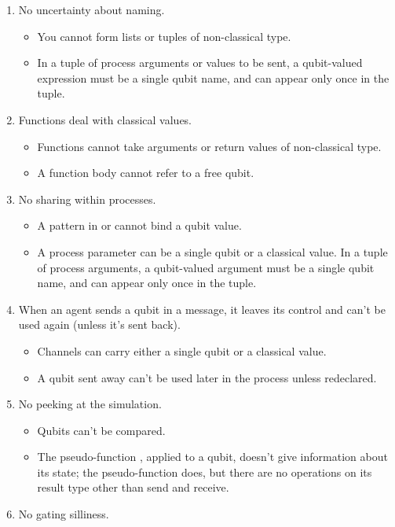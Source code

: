 \begin{enumerate}
\item No uncertainty about naming.
\begin{itemize}
\item You cannot form lists or tuples of non-classical type. 
\item In a tuple of process arguments or values to be sent, a qubit-valued expression must be a single qubit name, and can appear only once in the tuple.
\end{itemize}
\item Functions deal with classical values.
\begin{itemize}
\item Functions cannot take arguments or return values of non-classical type.
\item A function body cannot refer to a free qubit.
\end{itemize}
\item No sharing within processes.
\begin{itemize}
\item A pattern in  or  cannot bind a qubit value.
\item A process parameter can be a single qubit or a classical value. In a tuple of process arguments, a qubit-valued argument must be a single qubit name, and can appear only once in the tuple.
\end{itemize}
\item When an agent sends a qubit in a message, it leaves its control and can't be used again (unless it's sent back). 
\begin{itemize}
\item Channels can carry either a single qubit or a classical value.
\item A qubit sent away can't be used later in the process unless redeclared.
\end{itemize}
\item No peeking at the simulation.
\begin{itemize}
\item Qubits can't be compared.
\item The pseudo-function , applied to a qubit, doesn't give information about its state; the pseudo-function  does, but there are no operations on its result type  other than send and receive.
\end{itemize}
\item No gating silliness.
\begin{itemize}

\end{itemize}
\end{enumerate}
